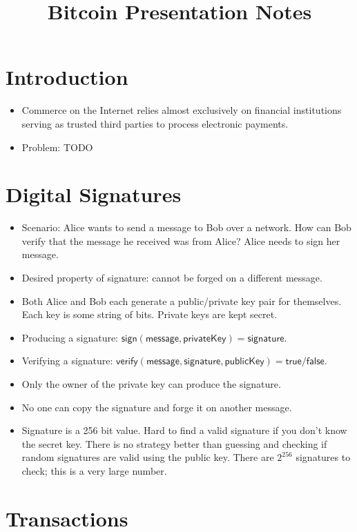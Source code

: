 \documentclass{article}
\title{Bitcoin Presentation Notes}
\author{}
\date{}
\begin{document}
\maketitle

\section{Introduction}

\begin{itemize}
  \item Commerce on the Internet relies almost exclusively on financial
    institutions serving as trusted third parties to process electronic
    payments.
  \item Problem: TODO
\end{itemize}

\section{Digital Signatures}

\begin{itemize}
  \item Scenario: Alice wants to send a message to Bob over a network. How can
    Bob verify that the message he received was from Alice? Alice needs to sign
    her message.
  \item Desired property of signature: cannot be forged on a different message.
  \item Both Alice and Bob each generate a public/private key pair for
    themselves. Each key is some string of bits. Private keys are kept secret.
  \item Producing a signature: $\mathsf{sign(message, privateKey)} =
    \mathsf{signature}$.
  \item Verifying a signature: $\mathsf{verify(message, signature, publicKey) =
    true / false}$.
  \item Only the owner of the private key can produce the signature.
  \item No one can copy the signature and forge it on another message.
  \item Signature is a 256 bit value. Hard to find a valid signature if you
    don't know the secret key. There is no strategy better than guessing and
    checking if random signatures are valid using the public key. There are
    $2^{256}$ signatures to check; this is a very large number.
\end{itemize}

\section{Transactions}
\end{document}
